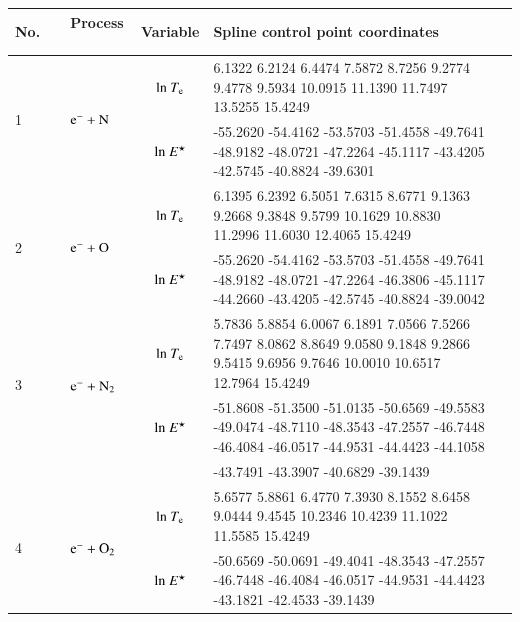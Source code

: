 \begin{table}[!htbp]
  \center{}
  \begin{threeparttable}
    \label{tab:spline_tab}
    \begin{tabular*}{\textwidth}{l@{\extracolsep{\fill}}lcll}
    \toprule
   No.~~ & Process ~& Variable & Spline control point coordinates  \\
        \midrule

        

  \multirow{2}{*}{1} &  \multirow{2}{*}{ $\rm e^- + N  $   } & ${\rm ln}~T_{\rm e}$  & \tiny      6.1322    6.2124    6.4474    7.5872    8.7256    9.2774    9.4778    9.5934   10.0915   11.1390   11.7497   13.5255   15.4249
 \\
  &  & ${\rm ln}~E^\star$     & \tiny -55.2620  -54.4162  -53.5703  -51.4558  -49.7641  -48.9182  -48.0721  -47.2264  -45.1117  -43.4205  -42.5745  -40.8824  -39.6301\\     
  \midrule  
      
  \multirow{2}{*}{2} &  \multirow{2}{*}{ $\rm e^- + O  $   } & ${\rm ln}~T_{\rm e}$  & \tiny    6.1395    6.2392    6.5051    7.6315    8.6771    9.1363    9.2668    9.3848    9.5799   10.1629   10.8830   11.2996   11.6030   12.4065   15.4249 \\
  &  & ${\rm ln}~E^\star$     & \tiny  -55.2620  -54.4162  -53.5703  -51.4558  -49.7641  -48.9182  -48.0721  -47.2264  -46.3806  -45.1117  -44.2660  -43.4205  -42.5745  -40.8824  -39.0042\\     
  \midrule    
  
  \multirow{2}{*}{3} &  \multirow{2}{*}{ $\rm e^- + N_2 $   } & ${\rm ln}~T_{\rm e}$  & \tiny      5.7836    5.8854    6.0067    6.1891    7.0566    7.5266    7.7497    8.0862    8.8649    9.0580    9.1848    9.2866    9.5415    9.6956    9.7646   10.0010   10.6517   12.7964   15.4249
\\
  &  & ${\rm ln}~E^\star$     & \tiny     -51.8608  -51.3500  -51.0135  -50.6569  -49.5583  -49.0474  -48.7110  -48.3543  -47.2557  -46.7448  -46.4084  -46.0517  -44.9531  -44.4423  -44.1058  
 \\     
  &  &       & \tiny     -43.7491  -43.3907  -40.6829  -39.1439\\
  \midrule  
  
  \multirow{2}{*}{4} &  \multirow{2}{*}{ $\rm e^- + O_2  $   } & ${\rm ln}~T_{\rm e}$  & \tiny     5.6577    5.8861    6.4770    7.3930    8.1552    8.6458    9.0444    9.4545   10.2346   10.4239   11.1022   11.5585   15.4249
  \\
  &  & ${\rm ln}~E^\star$     & \tiny    -50.6569  -50.0691  -49.4041  -48.3543  -47.2557  -46.7448  -46.4084  -46.0517  -44.9531  -44.4423  -43.1821  -42.4533  -39.1439
  \\     
  \midrule  
  

\end{tabular*}
\end{threeparttable}
\end{table}
